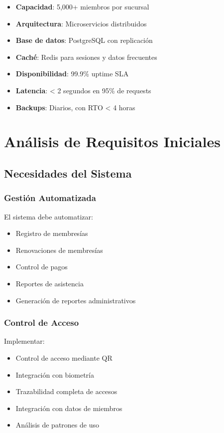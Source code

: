 \documentclass[11pt,a4paper]{article}
\begin{document}
\begin{itemize}
    \item \textbf{Capacidad}: 5,000+ miembros por sucursal
    \item \textbf{Arquitectura}: Microservicios distribuidos
    \item \textbf{Base de datos}: PostgreSQL con replicación
    \item \textbf{Caché}: Redis para sesiones y datos frecuentes
    \item \textbf{Disponibilidad}: 99.9\% uptime SLA
    \item \textbf{Latencia}: < 2 segundos en 95\% de requests
    \item \textbf{Backups}: Diarios, con RTO < 4 horas
\end{itemize}

\section{Análisis de Requisitos Iniciales}

\subsection{Necesidades del Sistema}

\subsubsection{Gestión Automatizada}

El sistema debe automatizar:
\begin{itemize}
    \item Registro de membresías
    \item Renovaciones de membresías
    \item Control de pagos
    \item Reportes de asistencia
    \item Generación de reportes administrativos
\end{itemize}

\subsubsection{Control de Acceso}

Implementar:
\begin{itemize}
    \item Control de acceso mediante QR
    \item Integración con biometría
    \item Trazabilidad completa de accesos
    \item Integración con datos de miembros
    \item Análisis de patrones de uso
\end{itemize}
\end{document}
